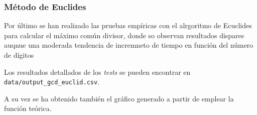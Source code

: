 \subsubsection{Método de Euclides}
Por último se han realizado las pruebas empíricas con el alrgoritmo de Ecuclides para calcular el máximo común divisor, donde so observan resultados dispares auqnue una moderada tendencia de incremneto de tiempo en función del número de dígitos
\begin{figure}[H]
\end{figure}
Los resultados detallados de los \textit{tests} se pueden encontrar en \texttt{data/output\_gcd\_euclid.csv}.

A su vez se ha obtenido también el gráfico generado a partir de emplear la función teórica.
\begin{figure}[H]
\end{figure}
